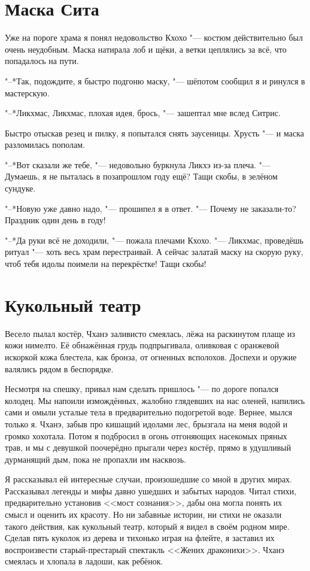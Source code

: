 \documentclass[a4paper,10pt,fleqn]{book}
\begin{document}
\section{Маска Сита}

Уже на пороге храма я понял недовольство Кхохо "--- костюм действительно был очень неудобным.
Маска натирала лоб и щёки, а ветки цеплялись за всё, что попадалось на пути.

"--*Так, подождите, я быстро подгоню маску, "--- шёпотом сообщил я и ринулся в мастерскую.

"--*Ликхмас, Ликхмас, плохая идея, брось, "--- зашептал мне вслед Ситрис.

Быстро отыскав резец и пилку, я попытался снять заусеницы.
Хрусть "--- и маска разломилась пополам.

"--*Вот сказали же тебе, "--- недовольно буркнула Ликхэ из-за плеча.
"--- Думаешь, я не пыталась в позапрошлом году ещё?
Тащи скобы, в зелёном сундуке.

"--*Новую уже давно надо, "--- прошипел я в ответ.
"--- Почему не заказали-то?
Праздник один день в году!

"--*Да руки всё не доходили, "--- пожала плечами Кхохо.
"--- Ликхмас, проведёшь ритуал "--- хоть весь храм перестраивай.
А сейчас залатай маску на скорую руку, чтоб тебя идолы поимели на перекрёстке!
Тащи скобы!

\section{Кукольный театр}

Весело пылал костёр, Чханэ заливисто смеялась, лёжа на раскинутом плаще из кожи нимелто.
Её обнажённая грудь подпрыгивала, оливковая с оранжевой искоркой кожа блестела, как бронза, от огненных всполохов.
Доспехи и оружие валялись рядом в беспорядке.

Несмотря на спешку, привал нам сделать пришлось "--- по дороге попался колодец.
Мы напоили измождённых, жалобно глядевших на нас оленей, напились сами и омыли усталые тела в предварительно подогретой воде.
Вернее, мылся только я.
Чханэ, забыв про кишащий идолами лес, брызгала на меня водой и громко хохотала.
Потом я подбросил в огонь отгоняющих насекомых пряных трав, и мы с девушкой поочерёдно прыгали через костёр, прямо в удушливый дурманящий дым, пока не пропахли им насквозь.

Я рассказывал ей интересные случаи, произошедшие со мной в других мирах.
Рассказывал легенды и мифы давно ушедших и забытых народов.
Читал стихи, предварительно установив <<мост сознания>>, дабы она могла понять их смысл и оценить их красоту.
Но ни забавные истории, ни стихи не оказали такого действия, как кукольный театр, который я видел в своём родном мире.
Сделав пять куколок из дерева и тихонько играя на флейте, я заставил их воспроизвести старый-престарый спектакль <<Жених драконихи>>.
Чханэ смеялась и хлопала в ладоши, как ребёнок.
\end{document}
